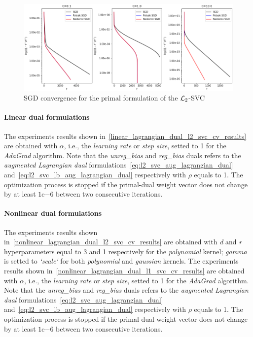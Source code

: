 

\begin{figure}[H]
	\centering
	\includegraphics[scale=0.55]{img/l2_svc_loss_history}
	\caption{SGD convergence for the primal formulation of the $\protect \mathcal{L}_2$-SVC}
	\label{fig:l2_svc_loss_history}
\end{figure}

\pagebreak

\paragraph{Linear dual formulations}

The experiments results shown in~\ref{linear_lagrangian_dual_l2_svc_cv_results} are obtained with $\alpha$, i.e., the \emph{learning rate} or \emph{step size}, setted to 1 for the \emph{AdaGrad} algorithm. Note that the \emph{unreg\_bias} and \emph{reg\_bias} duals refers to the \emph{augmented Lagrangian dual} formulations~\eqref{eq:l2_svc_aug_lagrangian_dual} and~\eqref{eq:l2_svc_lb_aug_lagrangian_dual} respectively with $\rho$ equals to 1. The optimization process is stopped if the primal-dual weight vector does not change by at least $1\mathrm{e}{-6}$  between two consecutive iterations.



\paragraph{Nonlinear dual formulations}

The experiments results shown in~\ref{nonlinear_lagrangian_dual_l2_svc_cv_results} are obtained with \emph{d} and \emph{r} hyperparameters equal to 3 and 1 respectively for the \emph{polynomial} kernel; \emph{gamma} is setted to \emph{`scale`} for both \emph{polynomial} and \emph{gaussian} kernels. The experiments results shown in~\ref{nonlinear_lagrangian_dual_l1_svc_cv_results} are obtained with $\alpha$, i.e., the \emph{learning rate} or \emph{step size}, setted to 1 for the \emph{AdaGrad} algorithm. Note that the \emph{unreg\_bias} and \emph{reg\_bias} duals refers to the \emph{augmented Lagrangian dual} formulations~\eqref{eq:l2_svc_aug_lagrangian_dual} and~\eqref{eq:l2_svc_lb_aug_lagrangian_dual} respectively with $\rho$ equals to 1. The optimization process is stopped if the primal-dual weight vector does not change by at least $1\mathrm{e}{-6}$  between two consecutive iterations.

